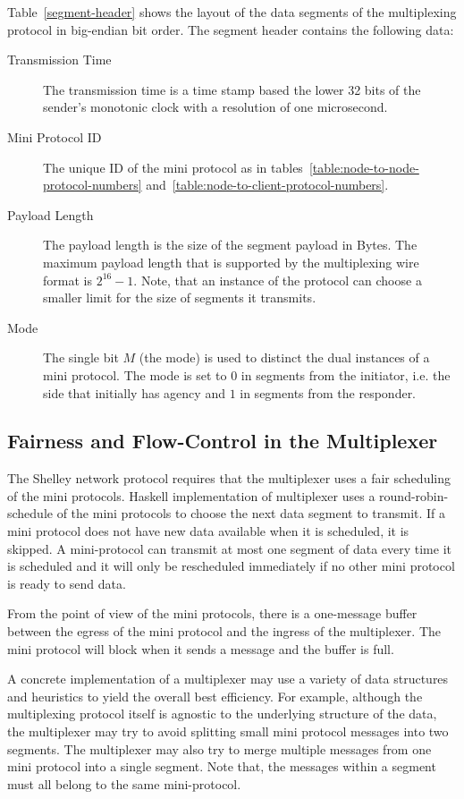 Table~\ref{segment-header} shows the layout of the data segments of the multiplexing protocol
in big-endian bit order.  The segment header contains the following data:
\begin{description}
\item[Transmission Time]
  The transmission time is a time stamp based the lower 32 bits of the sender's monotonic clock with a
  resolution of one microsecond.
\item[Mini Protocol ID] The unique ID of the mini protocol as in
  tables~\ref{table:node-to-node-protocol-numbers}
    and~\ref{table:node-to-client-protocol-numbers}.
\item[Payload Length] The payload length is the size of the segment payload in Bytes.
  The maximum payload length that is supported by the multiplexing wire format is $2^{16}-1$.
  Note, that an instance of the protocol can choose a smaller limit for the size of segments it transmits.
\item[Mode] The single bit $M$ (the mode) is used to distinct the dual instances of a mini protocol.
  The mode is set to $0$ in segments from the initiator, i.e. the side that initially has agency and
  $1$ in segments from the responder.
\end{description}

\subsection{Fairness and Flow-Control in the Multiplexer}
The Shelley network protocol requires that the multiplexer uses a fair
scheduling of the mini protocols.  Haskell implementation of
multiplexer uses a round-robin-schedule of the mini protocols to choose the
next data segment to transmit.  If a mini protocol does not have new data
available when it is scheduled, it is skipped.  A mini-protocol can transmit at
most one segment of data every time it is scheduled and it will only be
rescheduled immediately if no other mini protocol is ready to send data.

From the point of view of the mini protocols, there is a one-message buffer between the egress of
the mini protocol and the ingress of the multiplexer.
The mini protocol will block when it sends a message and the buffer is full.

A concrete implementation of a multiplexer may use a variety of data structures and heuristics to
yield the overall best efficiency.
For example, although the multiplexing protocol itself is agnostic to the underlying structure of
the data, the multiplexer may try to avoid splitting small mini protocol messages into two segments.
The multiplexer may also try to merge multiple messages from one mini protocol into a
single segment.
Note that, the messages within a segment must all belong to the same mini-protocol.

